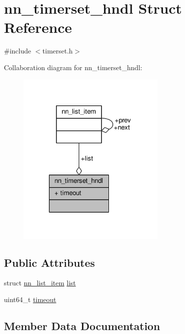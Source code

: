 \hypertarget{structnn__timerset__hndl}{}\section{nn\+\_\+timerset\+\_\+hndl Struct Reference}
\label{structnn__timerset__hndl}


{\ttfamily \#include $<$timerset.\+h$>$}



Collaboration diagram for nn\+\_\+timerset\+\_\+hndl\+:\nopagebreak
\begin{figure}[H]
\begin{center}
\leavevmode
\includegraphics[width=205pt]{structnn__timerset__hndl__coll__graph}
\end{center}
\end{figure}
\subsection*{Public Attributes}
\begin{DoxyCompactItemize}
\item 
struct \hyperlink{structnn__list__item}{nn\+\_\+list\+\_\+item} \hyperlink{structnn__timerset__hndl_a4b4e5d70f265a22cfa8b5c38e0cf0d0d}{list}
\item 
uint64\+\_\+t \hyperlink{structnn__timerset__hndl_ae5926df4c2f56c572797528f602657da}{timeout}
\end{DoxyCompactItemize}


\subsection{Member Data Documentation}

